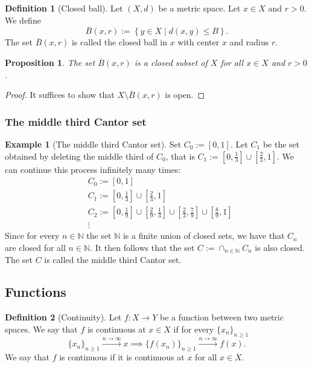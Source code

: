 \documentclass[11pt,a4paper]{article}
\theoremstyle{definition}
\newtheorem{definition}{Definition}[section]
\newtheorem{example}{Example}[section]
\theoremstyle{plain}
\newtheorem{proposition}[theorem]{Proposition}
\newcommand{\N}{\mathbb{N}}
\newcommand{\set}[2]{ \left\{ #1 \mid #2 \right\} }
\begin{document}
  \begin{definition}[Closed ball]
    Let $(X,d)$ be a metric space. Let $x \in X$ and $r > 0$.
    We define
    \[
      \overline{B}(x,r) := \set{y \in X}{d(x,y) \le B}. 
    \]
    The set $\overline{B}(x,r)$ is called the closed ball in $x$ with center
    $x$ and radius $r$.
  \end{definition}
  \begin{proposition}
    The set $\overline{B}(x,r)$ is a closed subset of $X$ for all $x \in X$
    and $r > 0$.
  \end{proposition}
  \begin{proof}
    It suffices to show that $X \setminus \overline B(x,r)$ is open.
  \end{proof}

  \subsubsection{The middle third Cantor set}

  \begin{example}[The middle third Cantor set]
    Set $C_0 := [0,1]$. Let $C_1$ be the set obtained by deleting the
    middle third of $C_0$, that is 
    $C_1 := \left[0,\frac 13\right] \cup \left[\frac 23,1\right]$.
    We can continue this process infinitely many times:
    \begin{align*}
      &C_0 := [0,1] \\
      &C_1 := \left[0,\frac 13\right] \cup \left[\frac 23,1\right] \\
      &C_2 := 
      \left[0, \frac 19\right] \cup
      \left[\frac 29, \frac 13\right] \cup
      \left[\frac 23, \frac 79\right] \cup
      \left[\frac 89, 1\right] \\
      &\vdots
    \end{align*}
    Since for every $n \in \N$ the set $\N$ is a finite union of closed
    sets, we have that $C_n$ are closed for all $n \in \N$. It then
    follows that the set $C := \cap_{n \in \N} C_n$ is also closed.
    The set $C$ is called the middle third Cantor set.
  \end{example}

  \subsection{Functions}

  \begin{definition}[Continuity]
    Let $f \colon X \to Y$ be a function between two metric spaces.
    We say that $f$ is continuous at $x \in X$ if for every $\{x_n\}_{n \geq 1}$
    \[
      \{x_n\}_{n \geq 1} \xrightarrow{n \to \infty} x \implies 
      \{f(x_n)\}_{n \geq 1} \xrightarrow{n \to \infty} f(x).
    \]
    We say that $f$ is continuous if it is continuous at $x$ for all
    $x \in X$.
  \end{definition}
\end{document}
